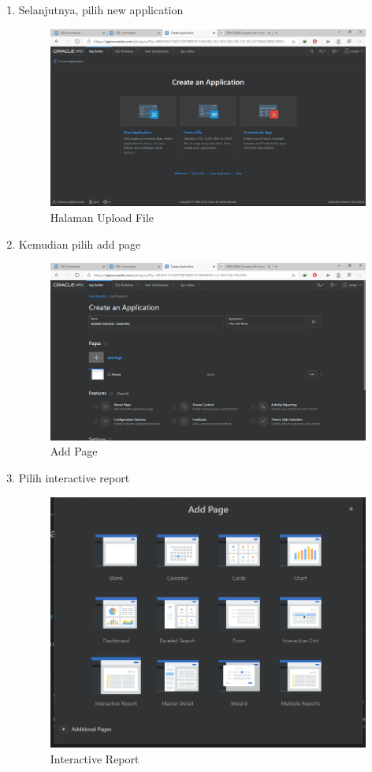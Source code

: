 \begin{enumerate}
\item Selanjutnya, pilih new application
\begin{figure}[H]
\centering
\caption{Halaman Upload File}
\includegraphics[width=1\textwidth]{figures/2.png}
\end{figure}


\item Kemudian pilih add page
\begin{figure}[H]
\centering
\caption{Add Page}
\includegraphics[width=1\textwidth]{figures/3.png}
\end{figure}

\item Pilih interactive report
\begin{figure}[H]
\centering
\caption{Interactive Report}
\includegraphics[width=1\textwidth]{figures/24.png}
\end{figure}


\end{enumerate}
